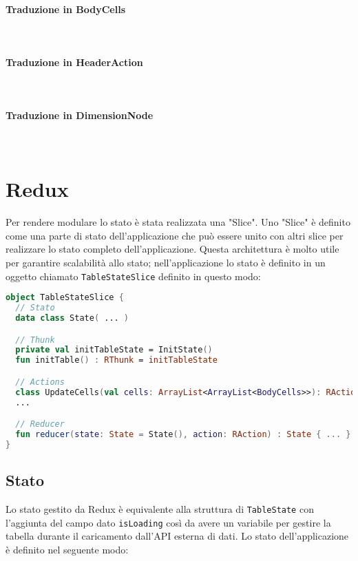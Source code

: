 \paragraph{Traduzione in BodyCells}\mbox{} \\


\paragraph{Traduzione in HeaderAction}\mbox{} \\


\paragraph{Traduzione in DimensionNode}\mbox{} \\


\section{Redux}
Per rendere modulare lo stato è stata realizzata una "Slice". Uno "Slice" è definito come una parte di stato dell'applicazione che può essere unito con altri slice per realizzare lo stato completo dell'applicazione. Questa architettura è molto utile per garantire scalabilità allo stato; nell'applicazione lo stato è definito in un oggetto chiamato \verb|TableStateSlice| definito in questo modo:
\begin{lstlisting}[caption={TableStateSlice}, label={lst:bodycells}, language=Kotlin]
object TableStateSlice {
  // Stato
  data class State( ... )

  // Thunk
  private val initTableState = InitState()
  fun initTable() : RThunk = initTableState

  // Actions
  class UpdateCells(val cells: ArrayList<ArrayList<BodyCells>>): RAction
  ...

  // Reducer
  fun reducer(state: State = State(), action: RAction) : State { ... }
}

\end{lstlisting}

\subsection{Stato}
Lo stato gestito da Redux è equivalente alla struttura di \verb|TableState| con l'aggiunta del campo dato \verb|isLoading| così da avere un variabile per gestire la tabella durante il caricamento dall'API esterna di dati. Lo stato dell'applicazione è definito nel seguente modo:

